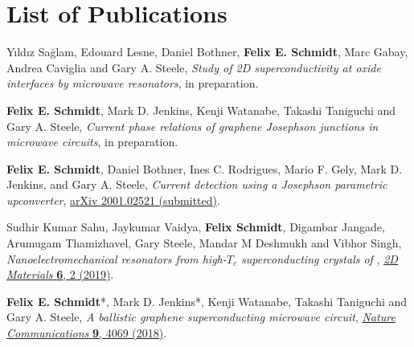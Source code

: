 \chapter*{List of Publications}
\label{publications}

\begin{etaremune}{\small

\item Yıldız Sağlam, Edouard Lesne, Daniel Bothner, \textbf{Felix E. Schmidt}, Marc Gabay, Andrea Caviglia and Gary A. Steele, \textit{Study of 2D superconductivity at oxide interfaces by microwave resonators}, in preparation.

\item \textbf{Felix E. Schmidt}, Mark D. Jenkins, Kenji Watanabe, Takashi Taniguchi and Gary A. Steele, \textit{Current phase relations of graphene Josephson junctions in microwave circuits}, in preparation.

\item \textbf{Felix E. Schmidt}, Daniel Bothner, Ines C. Rodrigues, Mario F. Gely, Mark D. Jenkins, and Gary A. Steele, \textit{Current detection using a Josephson parametric upconverter}, \href{https://arxiv.org/abs/2001.02521}{arXiv 2001.02521 (submitted)}.

\item Sudhir Kumar Sahu, Jaykumar Vaidya, \textbf{Felix Schmidt}, Digambar Jangade, Arumugam Thamizhavel, Gary Steele, Mandar M Deshmukh and Vibhor Singh, \textit{Nanoelectromechanical resonators from high-$T_c$ superconducting crystals of }, \href{https://doi.org/10.1088/2053-1583/ab0800}{\textit{2D Materials} \textbf{6}, 2 (2019)}.

\item \textbf{Felix E. Schmidt}*, Mark D. Jenkins*, Kenji Watanabe, Takashi Taniguchi and Gary A. Steele, \textit{A ballistic graphene superconducting microwave circuit}, \href{https://doi.org/10.1038/s41467-018-06595-2}{\textit{Nature Communications} \textbf{9}, 4069 (2018)}.

}\end{etaremune}

